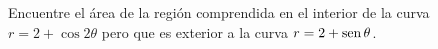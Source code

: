 \item Encuentre el área de la región comprendida en el interior de la curva $r = 2 + \cos 2\theta$ pero que es exterior a la curva $r = 2 + \operatorname{sen}\theta$.
